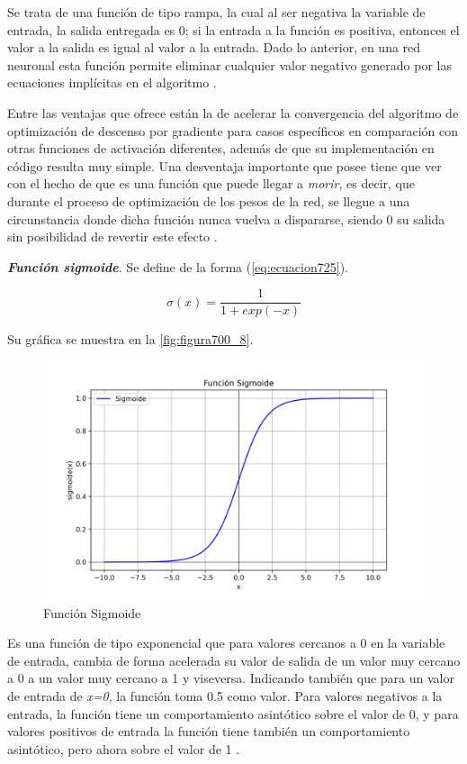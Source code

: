 {Se trata de una función de tipo rampa, la cual al ser negativa la variable de entrada, la salida entregada es 0; si la entrada a la función es positiva, entonces el valor a la salida es igual al valor a la entrada. Dado 
lo anterior, en una red neuronal esta función permite eliminar cualquier valor negativo generado por las ecuaciones implícitas en el algoritmo \cite{ReluBarcelona}.

Entre las ventajas que ofrece están la de acelerar la convergencia del algoritmo de optimización de descenso por gradiente para casos específicos en comparación con otras funciones de activación diferentes, además de que 
su implementación en código resulta muy simple. Una desventaja importante que posee tiene que ver con el hecho de que es una función que puede llegar a \textit{morir}, es decir, que durante el proceso de optimización de 
los pesos de la red, se llegue a una circunstancia donde dicha función nunca vuelva a dispararse, siendo 0 su salida sin posibilidad de revertir este efecto \cite{ReluBarcelona}.

\textbf{\textit{Función sigmoide}}. Se define de la forma (\ref{eq:ecuacion725}).

\begin{equation}
	\sigma(x)=\frac{1}{1+exp(-x)}
	\label{eq:ecuacion725}
\end{equation}

Su gráfica se muestra en la \autoref{fig:figura700_8}.

\begin{figure}[h]
	\centering
	\includegraphics[scale=0.8]{imgss205.png}
	\caption{Función Sigmoide}
	\label{fig:figura700_8}
\end{figure}

Es una función de tipo exponencial que para valores cercanos a 0 en la variable de entrada, cambia de forma acelerada su valor de salida de un valor muy cercano a 0 a un valor muy cercano a 1 y viseversa. 
Indicando también que para un valor de entrada de \textit{x=0}, la función toma 0.5 como valor.
Para valores negativos a la entrada, la función tiene un comportamiento asintótico sobre el valor de 0, y para valores positivos de entrada la función tiene también un comportamiento asintótico, pero ahora sobre el valor de 1 \cite{SeriesTemporalesAvanzadas}.

}
